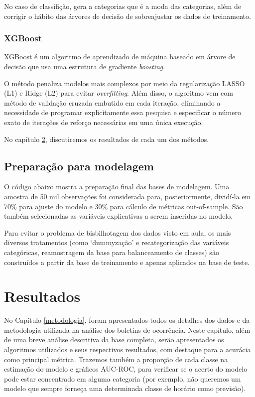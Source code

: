 \documentclass[
  12pt,
  portuguese,
]{report}
\begin{document}
No caso de classifição, gera a categorias que é a moda das categorias, além de corrigir o hábito das árvores de decisão de sobreajustar os dados de treinamento.

\hypertarget{xgboost}{%
\subsection{XGBoost}\label{xgboost}}

XGBoost é um algoritmo de aprendizado de máquina baseado em árvore de decisão que usa uma estrutura de gradiente \emph{boosting}.

O método penaliza modelos mais complexos por meio da regularização LASSO (L1) e Ridge (L2) para evitar \emph{overfitting}. Além disso, o algoritmo vem com método de validação cruzada embutido em cada iteração, eliminando a necessidade de programar explicitamente essa pesquisa e especificar o número exato de iterações de reforço necessárias em uma única execução.

No capítulo \ref{resultados}, discutiremos os resultados de cada um dos métodos.

\hypertarget{preparauxe7uxe3o-para-modelagem}{%
\section{Preparação para modelagem}\label{preparauxe7uxe3o-para-modelagem}}

O código abaixo mostra a preparação final das bases de modelagem. Uma amostra de 50 mil observações foi considerada para, posteriormente, dividí-la em 70\% para ajuste do modelo e 30\% para cálculo de métricas out-of-sample. São também selecionadas as variáveis explicativas a serem inseridas no modelo.

Para evitar o problema de bisbilhotagem dos dados visto em aula, os mais diversos tratamentos (como `dummyzação' e recategorização das variáveis categóricas, reamostragem da base para balanceamento de classes) são construídos a partir da base de treinamento e apenas aplicados na base de teste.

\hypertarget{resultados}{%
\chapter{Resultados}\label{resultados}}

No Capítulo \ref{metodologia}, foram apresentados todos os detalhes dos dados e da metodologia utilizada na análise dos boletins de ocorrência. Neste capítulo, além de uma breve análise descritiva da base completa, serão apresentados os algoritmos utilizados e seus respectivos resultados, com destaque para a acurácia como principal métrica. Trazemos também a proporção de cada classe na estimação do modelo e gráficos AUC-ROC, para verificar se o acerto do modelo pode estar concentrado em alguma categoria (por exemplo, não queremos um modelo que sempre forneça uma determinada classe de horário como previsão).
\end{document}

